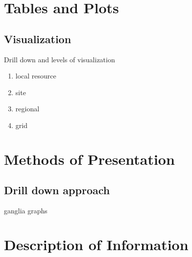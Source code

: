\section{Tables and Plots}
\subsection{Visualization}
Drill down and levels of visualization
\begin{enumerate}
  \item local resource
  \item site
  \item regional
  \item grid
\end{enumerate}
\section{Methods of Presentation}
\subsection{Drill down approach}
ganglia graphs
\section{Description of Information}
